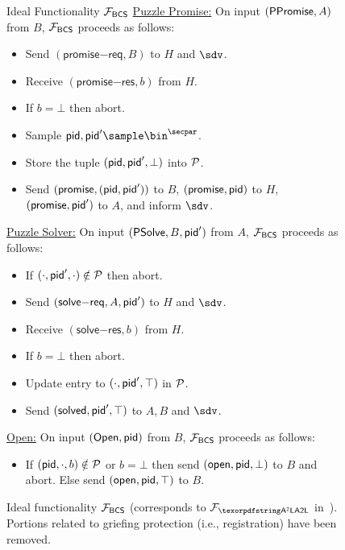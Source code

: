 \begin{figure}[tb]
    \centering
    \begin{idealFunctionality}{Ideal Functionality $\mathcal{F}_{\mathsf{BCS}}$}
    \noindent\underline{Puzzle Promise:} On input $(\mathsf{PPromise}, A)$ from $B$, $\mathcal{F}_{\mathsf{BCS}}$ 
    proceeds as follows:
    \begin{itemize}
        \item Send $(\mathsf{promise}\mathsf{-req}, B)$ to $H$	 and $\sdv$. %
        \item Receive $(\mathsf{promise}\mathsf{-res}, b)$ from $H$.
        \item If $b = \bot$ then abort.
        \item Sample $\pid, \pid' \sample \bin^\secpar$.
        \item Store the tuple $(\mathsf{pid}, \mathsf{pid}', \bot)$ into $\mathcal{P}$.
        \item Send $(\mathsf{promise}, (\mathsf{pid},\mathsf{pid}'))$ to $B$, $(\mathsf{promise}, \mathsf{pid})$ to $H$, $(\mathsf{promise}, \mathsf{pid}')$ to $A$, and inform $\sdv$. 
    \end{itemize}
    
    \noindent\underline{Puzzle Solver:} On input $(\mathsf{PSolve}, B, \mathsf{pid}')$ from $A$, $\mathcal{F}_{\mathsf{BCS}}$ proceeds 
    as follows:
    \begin{itemize}
        \item If $(\cdot, \mathsf{pid}', \cdot) \notin \mathcal{P}$ then abort.
        \item Send $(\mathsf{solve}\mathsf{-req}, A, \mathsf{pid}')$ to $H$ and $\sdv$.
        \item Receive $(\mathsf{solve}\mathsf{-res}, b)$ from $H$.
        \item If $b = \bot$ then abort.
        \item Update entry to $(\cdot, \mathsf{pid}', \top)$ in $\mathcal{P}$.
        \item Send $(\mathsf{solved}, \mathsf{pid}', \top)$ to $A, B$ and $\sdv$.
    \end{itemize}
    
    \noindent\underline{Open:} On input $(\mathsf{Open}, \mathsf{pid})$ from $B$, $\mathcal{F}_{\mathsf{BCS}}$ proceeds as 
    follows:
    \begin{itemize}
        \item If $(\mathsf{pid}, \cdot, b) \notin \mathcal{P}$ or $b = \bot$ then send $(\mathsf{open},\mathsf{pid}, \bot)$ to $B$ and abort. Else send $(\mathsf{open}, \mathsf{pid}, \top)$ to $B$.
    \end{itemize}
    \end{idealFunctionality}
    \caption{Ideal functionality $\mathcal{F}_{\mathsf{BCS}}$ (corresponds to $\F_{\AAL}$ in~\cite{SP:TaiMorMaf21}). Portions related to griefing protection (i.e., registration) have been removed.}
    \label{fig:ideal-a2l}
    \end{figure}